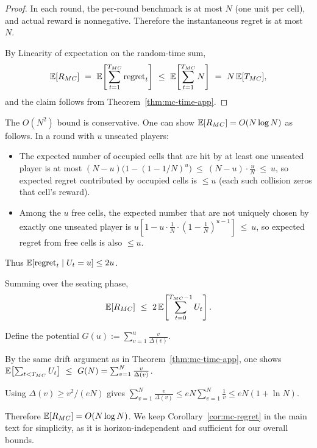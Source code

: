 \begin{proof}
In each round, the per-round benchmark is at most $N$ (one unit per cell), and actual reward is nonnegative. Therefore the instantaneous regret is at most $N$.

By Linearity of expectation on the random-time sum,
\[
\EE[R_{MC}] \ =\ \EE\!\left[\sum_{t=1}^{T_{MC}} \text{regret}_t\right]
\ \le\ \EE\!\left[\sum_{t=1}^{T_{MC}} N\right]\ =\ N\,\EE[T_{MC}],
\]
and the claim follows from Theorem~\ref{thm:mc-time-app}.
\end{proof}

\begin{remark}
\label{rem:mc-regret-sharp}
The $O(N^2)$ bound is conservative. One can show $\mathbb{E}[R_{MC}]=O(N\log N)$ as follows.
In a round with $u$ unseated players:
\begin{itemize}
\item The expected number of occupied cells that are hit by at least one unseated player is at most
$(N-u)\bigl(1-(1-1/N)^u\bigr)\ \le\ (N-u)\cdot \frac{u}{N}\ \le\ u$,
so expected regret contributed by  {occupied} cells is $\le u$ (each such collision zeros that cell’s reward).
\item Among the $u$ free cells, the expected number that are  {not} uniquely chosen by exactly one unseated player is
$u\left[1 - u\cdot \tfrac{1}{N}\cdot (1-\tfrac{1}{N})^{u-1}\right]\ \le\ u$,
so expected regret from  {free} cells is also $\le u$.
\end{itemize}

Thus $\mathbb{E}[\text{regret}_t\mid U_t=u]\le 2u$. 

Summing over the seating phase,
\[
\EE[R_{MC}]\ \le\ 2\,\EE\!\left[\sum_{t=0}^{T_{MC}-1} U_t\right].
\]

Define the potential $G(u):=\sum_{v=1}^{u}\frac{v}{\Delta(v)}$. 

By the same drift argument as in Theorem~\ref{thm:mc-time-app}, one shows
$\EE\!\left[\sum_{t< T_{MC}} U_t\right]\ \le\ G(N)=\sum_{v=1}^{N}\frac{v}{\Delta(v)}$.

Using $\Delta(v)\ge v^2/(eN)$ gives $\sum_{v=1}^{N}\frac{v}{\Delta(v)}\le eN \sum_{v=1}^{N}\frac{1}{v}\le eN(1+\ln N)$.

Therefore $\mathbb{E}[R_{MC}]=O(N\log N)$. We keep Corollary~\ref{cor:mc-regret} in the main text for simplicity, as it is horizon-independent and sufficient for our overall bounds.
\end{remark}


\bigskip



